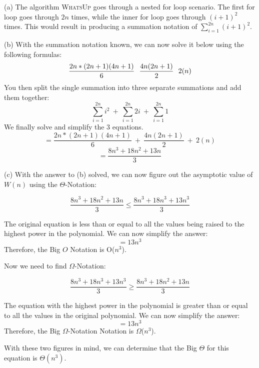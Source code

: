 \documentclass{article}
\begin{document}
\begin{solution}
\begin{description}
\item{(a)} The algorithm \textsc{WhatsUp} goes through a nested for loop scenario. The first for loop goes through $2n$ times, while the inner for loop goes through $(i+1)^2$ times. This would result in producing a summation notation of $\sum_{i=1}^{2n} {(i+1)^2}$.

\item{(b)} With the summation notation known, we can now solve it below using the following formulas:
\smallskip
\begin{equation}
%
\frac{2n*(2n+1)(4n+1)}{6} \> \> \> \frac{4n(2n+1)}{2} \> \> \> 2(n)
\smallskip
\end{equation}
You then split the single summation into three separate summations and add them together:
\smallskip
\begin{equation}
\sum_{i=1}^{2n} {i^2} \> + \> \sum_{i=1}^{2n} {2i} \> + \> \sum_{i=1}^{2n} {1}
\end{equation}
\smallskip
We finally solve and simplify the 3 equations.
\begin{equation}
    = \frac{2n*(2n+1)(4n+1)}{6} \> + \> \frac{4n(2n+1)}{2} \> + \> 2(n)
\end{equation}
\smallskip
\begin{equation}
    = \frac{8n^3+18n^2+13n}{3}
\end{equation}

\item{(c)} With the answer to (b) solved, we can now figure out the asymptotic value of $W(n)$ using the $\Theta$-Notation:

\begin{equation}
    \frac{8n^3+18n^2+13n}{3} \le \frac{8n^3+18n^3+13n^3}{3}
\end{equation}


The original equation is less than or equal to all the values being raised to the highest power in the polynomial. We can now simplify the answer:
\smallskip
\begin{equation}
    =13n^3
\end{equation}
Therefore, the Big $O$ Notation is O($n^3$).



Now we need to find $\Omega$-Notation:

\smallskip
\begin{equation}
\frac{8n^3+18n^3+13n^3}{3} \ge \frac{8n^3+18n^2+13n}{3}
\end{equation}
\smallskip

The equation with the highest power in the polynomial is greater than or equal to all the values in the original polynomial. We can now simplify the answer:
\smallskip
\begin{equation}
    =13n^3
\end{equation}
Therefore, the Big $\Omega$-Notation Notation is $\Omega$($n^3$).

With these two figures in mind, we can determine that the Big $\Theta$ for this equation is $\Theta$$(n^3)$.

\end{description}
\end{solution}
\end{document}
